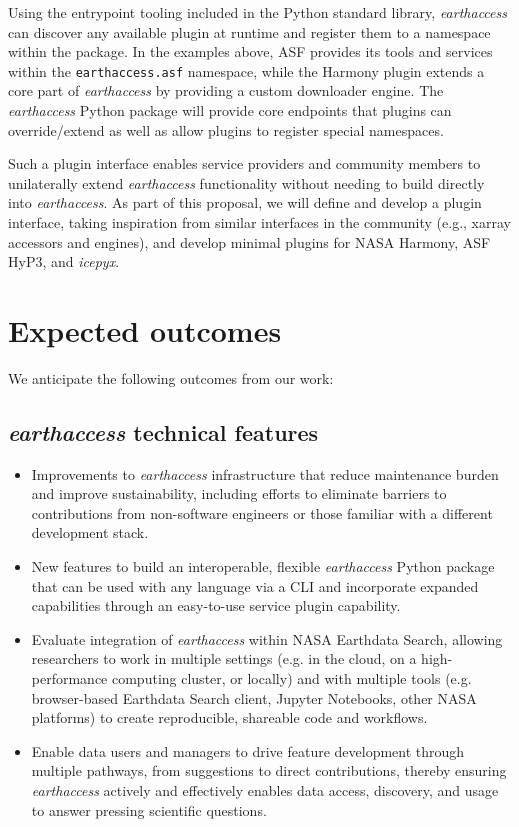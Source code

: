 \documentclass{ROSES-NASA-proposal}
\newcommand{\earthaccess}{\textit{earthaccess}\xspace} %
\begin{document}
Using the entrypoint tooling included in the Python standard library, \earthaccess can discover any available plugin at runtime and register them to a namespace within the package. In the examples above, ASF provides its tools and services within the \texttt{earthaccess.asf} namespace, while the Harmony plugin extends a core part of \earthaccess by providing a custom downloader engine. The \earthaccess Python package will provide core endpoints that plugins can override/extend as well as allow plugins to register special namespaces. 

Such a plugin interface enables service providers and community members to unilaterally extend \earthaccess functionality without needing to build directly into \earthaccess. As part of this proposal, we will define and develop a plugin interface, taking inspiration from similar interfaces in the community (e.g., xarray accessors and engines), and develop minimal plugins for NASA Harmony, ASF HyP3, and \textit{icepyx}. 

\section{Expected outcomes}

We anticipate the following outcomes from our work:

\subsection{\earthaccess technical features}

\begin{itemize}[itemsep=-.1em]
     \item Improvements to \earthaccess infrastructure that reduce maintenance burden and improve sustainability, including efforts to eliminate barriers to contributions from non-software engineers or those familiar with a different development stack.
     \item New features to build an interoperable, flexible \earthaccess Python package that can be used with any language via a CLI and incorporate expanded capabilities through an easy-to-use service plugin capability.
     \item Evaluate integration of \earthaccess within NASA Earthdata Search, allowing researchers to work in multiple settings (e.g. in the cloud, on a high-performance computing cluster, or locally) and with multiple tools (e.g. browser-based Earthdata Search client, Jupyter Notebooks, other NASA platforms) to create reproducible, shareable code and workflows.
     \item Enable data users and managers to drive feature development through multiple pathways, from suggestions to direct contributions, thereby ensuring \earthaccess actively and effectively enables data access, discovery, and usage to answer pressing scientific questions. 
\end{itemize}
\end{document}
